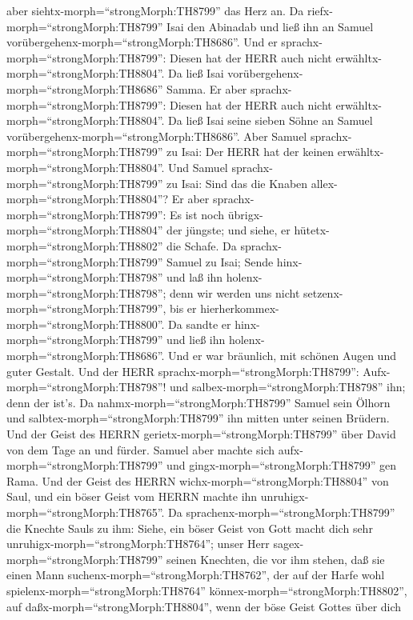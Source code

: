 aber siehtx-morph=``strongMorph:TH8799'' das Herz an.  Da
riefx-morph=``strongMorph:TH8799'' Isai den Abinadab und ließ ihn an
Samuel vorübergehenx-morph=``strongMorph:TH8686''. Und er
sprachx-morph=``strongMorph:TH8799'': Diesen hat der HERR auch nicht
erwähltx-morph=``strongMorph:TH8804''.  Da ließ Isai
vorübergehenx-morph=``strongMorph:TH8686'' Samma. Er aber
sprachx-morph=``strongMorph:TH8799'': Diesen hat der HERR auch nicht
erwähltx-morph=``strongMorph:TH8804''.  Da ließ Isai seine
sieben Söhne an Samuel vorübergehenx-morph=``strongMorph:TH8686''. Aber
Samuel sprachx-morph=``strongMorph:TH8799'' zu Isai: Der HERR hat der
keinen erwähltx-morph=``strongMorph:TH8804''.  Und Samuel
sprachx-morph=``strongMorph:TH8799'' zu Isai: Sind das die Knaben
allex-morph=``strongMorph:TH8804''? Er aber
sprachx-morph=``strongMorph:TH8799'': Es ist noch
übrigx-morph=``strongMorph:TH8804'' der jüngste; und siehe, er
hütetx-morph=``strongMorph:TH8802'' die Schafe. Da
sprachx-morph=``strongMorph:TH8799'' Samuel zu Isai; Sende
hinx-morph=``strongMorph:TH8798'' und laß ihn
holenx-morph=``strongMorph:TH8798''; denn wir werden uns nicht
setzenx-morph=``strongMorph:TH8799'', bis er
hierherkommex-morph=``strongMorph:TH8800''.  Da sandte er
hinx-morph=``strongMorph:TH8799'' und ließ ihn
holenx-morph=``strongMorph:TH8686''. Und er war bräunlich, mit schönen
Augen und guter Gestalt. Und der HERR
sprachx-morph=``strongMorph:TH8799'': Aufx-morph=``strongMorph:TH8798''!
und salbex-morph=``strongMorph:TH8798'' ihn; denn der ist's.
 Da nahmx-morph=``strongMorph:TH8799'' Samuel sein Ölhorn
und salbtex-morph=``strongMorph:TH8799'' ihn mitten unter seinen
Brüdern. Und der Geist des HERRN gerietx-morph=``strongMorph:TH8799''
über David von dem Tage an und fürder. Samuel aber machte sich
aufx-morph=``strongMorph:TH8799'' und gingx-morph=``strongMorph:TH8799''
gen Rama.  Und der Geist des HERRN
wichx-morph=``strongMorph:TH8804'' von Saul, und ein böser Geist vom
HERRN machte ihn unruhigx-morph=``strongMorph:TH8765''.  Da
sprachenx-morph=``strongMorph:TH8799'' die Knechte Sauls zu ihm: Siehe,
ein böser Geist von Gott macht dich sehr
unruhigx-morph=``strongMorph:TH8764'';  unser Herr
sagex-morph=``strongMorph:TH8799'' seinen Knechten, die vor ihm stehen,
daß sie einen Mann suchenx-morph=``strongMorph:TH8762'', der auf der
Harfe wohl spielenx-morph=``strongMorph:TH8764''
könnex-morph=``strongMorph:TH8802'', auf
daßx-morph=``strongMorph:TH8804'', wenn der böse Geist Gottes über dich
